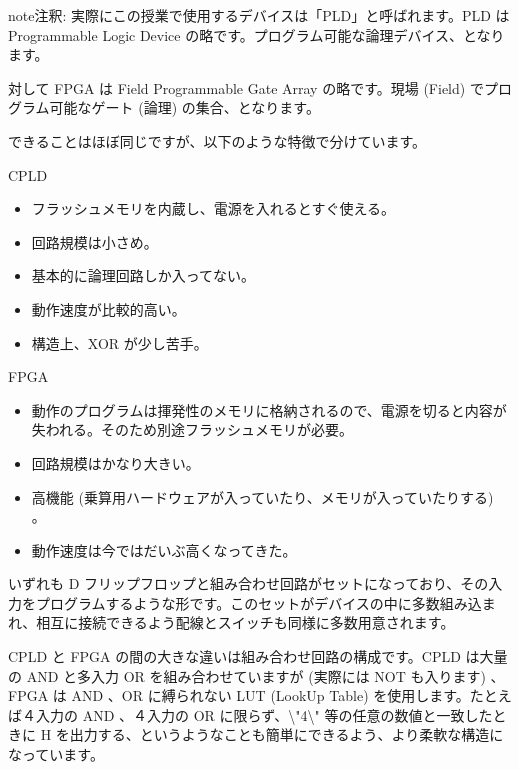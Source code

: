 \documentclass[letterpaper,10pt,dvipdfmx]{sphinxmanual}
\begin{document}
\begin{sphinxadmonition}{note}{注釈:}
実際にこの授業で使用するデバイスは「PLD」と呼ばれます。PLD は Programmable Logic Device の略です。プログラム可能な論理デバイス、となります。

対して FPGA は Field Programmable Gate Array の略です。現場 (Field) でプログラム可能なゲート (論理) の集合、となります。

できることはほぼ同じですが、以下のような特徴で分けています。

CPLD
\begin{itemize}
\item {} 
フラッシュメモリを内蔵し、電源を入れるとすぐ使える。

\item {} 
回路規模は小さめ。

\item {} 
基本的に論理回路しか入ってない。

\item {} 
動作速度が比較的高い。

\item {} 
構造上、XOR が少し苦手。

\end{itemize}

FPGA
\begin{itemize}
\item {} 
動作のプログラムは揮発性のメモリに格納されるので、電源を切ると内容が失われる。そのため別途フラッシュメモリが必要。

\item {} 
回路規模はかなり大きい。

\item {} 
高機能 (乗算用ハードウェアが入っていたり、メモリが入っていたりする) 。

\item {} 
動作速度は今ではだいぶ高くなってきた。

\end{itemize}

いずれも D フリップフロップと組み合わせ回路がセットになっており、その入力をプログラムするような形です。このセットがデバイスの中に多数組み込まれ、相互に接続できるよう配線とスイッチも同様に多数用意されます。

CPLD と FPGA の間の大きな違いは組み合わせ回路の構成です。CPLD は大量の AND と多入力 OR を組み合わせていますが (実際には NOT も入ります) 、FPGA は AND 、OR に縛られない LUT (LookUp Table) を使用します。たとえば４入力の AND 、４入力の OR に限らず、\textbackslash{}"4\textbackslash{}" 等の任意の数値と一致したときに H を出力する、というようなことも簡単にできるよう、より柔軟な構造になっています。
\end{sphinxadmonition}
\end{document}

